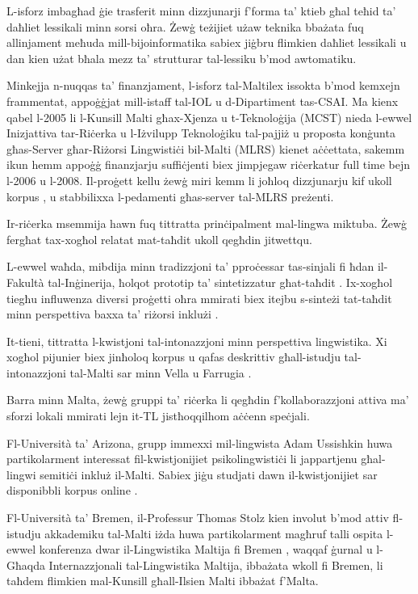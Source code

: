 \documentclass[]{../../metanetpaper}
\begin{document}
\begin{multicols}{2}
L-isforz imbagħad ġie trasferit minn dizzjunarji f’forma ta’ ktieb għal teħid ta’ daħliet lessikali minn sorsi oħra. Żewġ teżijiet \cite{Dalli:2001, Attard:2006} użaw teknika bbażata fuq allinjament meħuda mill-bijoinformatika sabiex jiġbru flimkien daħliet lessikali u dan kien użat bħala mezz ta’ strutturar tal-lessiku b’mod awtomatiku.

Minkejja n-nuqqas ta’ finanzjament, l-isforz tal-Maltilex issokta b’mod kemxejn frammentat, appoġġjat mill-istaff tal-IOL u d-Dipartiment tas-CSAI. Ma kienx qabel l-2005 li l-Kunsill Malti għax-Xjenza u t-Teknoloġija (MCST) nieda l-ewwel Inizjattiva tar-Riċerka u l-Iżvilupp Teknoloġiku tal-pajjiż u proposta konġunta għas-Server għar-Riżorsi Lingwistiċi bil-Malti (MLRS) kienet aċċettata, sakemm ikun hemm appoġġ finanzjarju suffiċjenti biex jimpjegaw riċerkatur full time bejn l-2006 u l-2008. Il-proġett kellu żewġ miri kemm li joħloq dizzjunarju kif ukoll korpus \cite{Rosner:2008}, u stabbilixxa l-pedamenti għas-server tal-MLRS preżenti.

Ir-riċerka msemmija hawn fuq tittratta prinċipalment mal-lingwa miktuba. Żewġ fergħat tax-xogħol relatat mat-taħdit ukoll qegħdin jitwettqu. 

L-ewwel waħda, mibdija minn tradizzjoni ta’ pproċessar tas-sinjali fi ħdan il-Fakultà tal-Inġinerija, ħolqot prototip ta’ sintetizzatur għat-taħdit \cite{Micallef:1997}. Ix-xogħol tiegħu influwenza diversi proġetti oħra mmirati biex itejbu s-sinteżi tat-taħdit minn perspettiva baxxa ta’ riżorsi inklużi \cite{Calleja:2002, Farrugia:2005, Camilleri:2010, Borg-et-al:2011}.

It-tieni, tittratta l-kwistjoni tal-intonazzjoni \cite{Vella:2007} minn perspettiva lingwistika. Xi xogħol pijunier biex jinħoloq korpus u qafas deskrittiv għall-istudju tal-intonazzjoni tal-Malti sar minn Vella u Farrugia \cite{Vella-and-Farrugia:2006}.

Barra minn Malta, żewġ gruppi ta’ riċerka li qegħdin f’kollaborazzjoni attiva ma’ sforzi lokali mmirati lejn it-TL  jistħoqqilhom aċċenn speċjali.

Fl-Università ta’ Arizona, grupp immexxi mil-lingwista Adam Ussishkin huwa partikolarment interessat fil-kwistjonijiet psikolingwistiċi li jappartjenu għal-lingwi semitiċi inkluż il-Malti. Sabiex jiġu studjati dawn il-kwistjonijiet sar disponibbli korpus online \cite{Ussishkin-et-al:2009}.

Fl-Università ta’ Bremen, il-Professur Thomas Stolz kien involut b’mod attiv fl-istudju akkademiku tal-Malti iżda huwa partikolarment magħruf talli ospita l-ewwel konferenza dwar il-Lingwistika Maltija fi Bremen \cite{Comrie-et-al:2009}, waqqaf ġurnal\cite{GHILM2} u l-Għaqda Internazzjonali tal-Lingwistika Maltija, ibbażata wkoll fi Bremen, li taħdem flimkien mal-Kunsill għall-Ilsien Malti ibbażat f’Malta.


\end{multicols}
\end{document}
